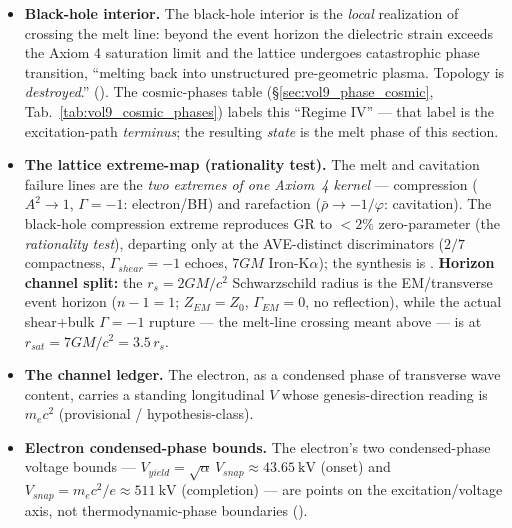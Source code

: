 \begin{itemize}
    \item \textbf{Black-hole interior.} The black-hole interior is the \emph{local} realization of crossing the melt line: beyond the event horizon the dielectric strain exceeds the Axiom 4 saturation limit and the lattice undergoes catastrophic phase transition, ``melting back into unstructured pre-geometric plasma. Topology is \emph{destroyed}.'' (). The cosmic-phases table (\S\ref{sec:vol9_phase_cosmic}, Tab.~\ref{tab:vol9_cosmic_phases}) labels this ``Regime IV'' --- that label is the excitation-path \emph{terminus}; the resulting \emph{state} is the melt phase of this section.
    \item \textbf{The lattice extreme-map (rationality test).} The melt and cavitation failure lines are the \emph{two extremes of one Axiom~4 kernel} --- compression ($A^2\to1$, $\Gamma=-1$\gammaundeclared{}: electron/BH) and rarefaction ($\bar\rho\to-1/\varphi$: cavitation). The black-hole compression extreme reproduces GR to $<2\%$ zero-parameter (the \emph{rationality test}), departing only at the AVE-distinct discriminators ($2/7$ compactness, $\Gamma_{shear}=-1$ echoes, $7GM$ Iron-K$\alpha$); the synthesis is . \textbf{Horizon channel split:} the $r_s = 2GM/c^2$ Schwarzschild radius is the EM/transverse event horizon ($n-1=1$; $Z_{EM}=Z_0$, $\Gamma_{EM}=0$, no reflection), while the actual shear+bulk $\Gamma=-1$\gammaundeclared{} rupture --- the melt-line crossing meant above --- is at $r_{sat} = 7GM/c^2 = 3.5\,r_s$.
    \item \textbf{The channel ledger.} The electron, as a condensed phase of transverse wave content, carries a standing longitudinal $V$ whose genesis-direction reading is $m_e c^2$ (provisional / hypothesis-class).
    \item \textbf{Electron condensed-phase bounds.} The electron's two condensed-phase voltage bounds --- $V_{yield} = \sqrt{\alpha}\,V_{snap} \approx \qty{43.65}{\kilo\volt}$ (onset) and $V_{snap} = m_e c^2/e \approx \qty{511}{\kilo\volt}$ (completion) --- are points on the excitation/voltage axis, not thermodynamic-phase boundaries ().
\end{itemize}

